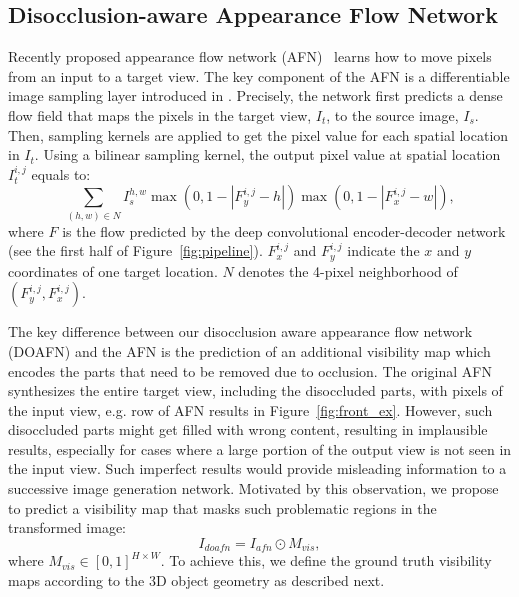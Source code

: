 \documentclass[10pt,twocolumn,letterpaper]{article}
\begin{document}
\subsection{Disocclusion-aware Appearance Flow Network}
\label{sec:doafn}
Recently proposed appearance flow network (AFN)~\cite{Zhou_eccv2016} learns how to move pixels from an input to a target view. The key component of the AFN is a differentiable image sampling layer introduced in \cite{jaderberg_NIPS2015}. Precisely, the network first predicts a dense flow field that maps the pixels in the target view, $I_t$, to the source image, $I_s$. Then, sampling kernels are applied to get the pixel value for each spatial location in $I_t$. Using a bilinear sampling kernel, the output pixel value at spatial location $I_t^{i,j}$ equals to:
\begin{equation}
\sum_{(h,w) \in N} I_s^{h,w} \max(0,1-|F_y^{i,j}-h|) \max(0,1-|F_x^{i,j}-w|),
\end{equation}
where $F$ is the flow predicted by the deep convolutional encoder-decoder network (see the first half of Figure~\ref{fig:pipeline}). $F_x^{i,j}$ and $F_y^{i,j}$ indicate the $x$ and $y$ coordinates of one target location. $N$ denotes the 4-pixel neighborhood of $(F_y^{i,j},F_x^{i,j})$. 

The key difference between our disocclusion aware appearance flow network (DOAFN) and the AFN is the prediction of an additional visibility map which encodes the parts that need to be removed due to occlusion. The original AFN synthesizes the entire target view, including the disoccluded parts, with pixels of the input view, e.g.  row of AFN results in Figure~\ref{fig:front_ex}. However, such disoccluded parts might get filled with wrong content, resulting in implausible results, especially for cases where a large portion of the output view is not seen in the input view. Such imperfect results would provide misleading information to a successive image generation network. Motivated by this observation, we propose to predict a visibility map that masks such problematic regions in the transformed image:
\begin{equation}
I_{doafn} = I_{afn} \odot M_{vis},
\end{equation}
where $M_{vis} \in [0,1]^{H \times W}$. 
To achieve this, we define the ground truth visibility maps according to the 3D object geometry as described next.

\vspace{-2mm}
\end{document}

